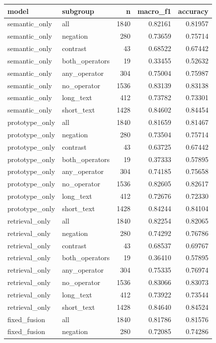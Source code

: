 \begin{tabular}{llrrr}
\toprule
model & subgroup & n & macro_f1 & accuracy \\
\midrule
semantic_only & all & 1840 & 0.82161 & 0.81957 \\
semantic_only & negation & 280 & 0.73659 & 0.75714 \\
semantic_only & contrast & 43 & 0.68522 & 0.67442 \\
semantic_only & both_operators & 19 & 0.33455 & 0.52632 \\
semantic_only & any_operator & 304 & 0.75004 & 0.75987 \\
semantic_only & no_operator & 1536 & 0.83139 & 0.83138 \\
semantic_only & long_text & 412 & 0.73782 & 0.73301 \\
semantic_only & short_text & 1428 & 0.84602 & 0.84454 \\
prototype_only & all & 1840 & 0.81659 & 0.81467 \\
prototype_only & negation & 280 & 0.73504 & 0.75714 \\
prototype_only & contrast & 43 & 0.63725 & 0.67442 \\
prototype_only & both_operators & 19 & 0.37333 & 0.57895 \\
prototype_only & any_operator & 304 & 0.74185 & 0.75658 \\
prototype_only & no_operator & 1536 & 0.82605 & 0.82617 \\
prototype_only & long_text & 412 & 0.72676 & 0.72330 \\
prototype_only & short_text & 1428 & 0.84244 & 0.84104 \\
retrieval_only & all & 1840 & 0.82254 & 0.82065 \\
retrieval_only & negation & 280 & 0.74292 & 0.76786 \\
retrieval_only & contrast & 43 & 0.68537 & 0.69767 \\
retrieval_only & both_operators & 19 & 0.36410 & 0.57895 \\
retrieval_only & any_operator & 304 & 0.75335 & 0.76974 \\
retrieval_only & no_operator & 1536 & 0.83066 & 0.83073 \\
retrieval_only & long_text & 412 & 0.73922 & 0.73544 \\
retrieval_only & short_text & 1428 & 0.84640 & 0.84524 \\
fixed_fusion & all & 1840 & 0.81786 & 0.81576 \\
fixed_fusion & negation & 280 & 0.72085 & 0.74286 \\

\end{tabular}
